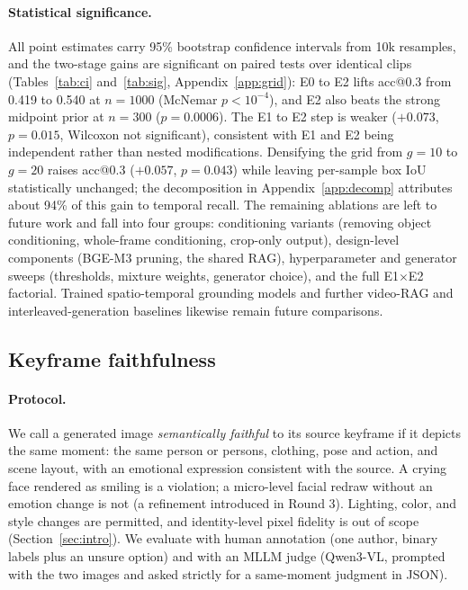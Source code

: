 \documentclass[10pt]{article}
\begin{document}
\paragraph{Statistical significance.}
All point estimates carry 95\% bootstrap confidence intervals from 10k resamples, and the two-stage gains are significant on paired tests over identical clips (Tables~\ref{tab:ci} and~\ref{tab:sig}, Appendix~\ref{app:grid}): E0 to E2 lifts acc@0.3 from 0.419 to 0.540 at $n=1000$ (McNemar $p<10^{-4}$), and E2 also beats the strong midpoint prior at $n=300$ ($p=0.0006$). The E1 to E2 step is weaker ($+0.073$, $p=0.015$, Wilcoxon not significant), consistent with E1 and E2 being independent rather than nested modifications. Densifying the grid from $g=10$ to $g=20$ raises acc@0.3 ($+0.057$, $p=0.043$) while leaving per-sample box IoU statistically unchanged; the decomposition in Appendix~\ref{app:decomp} attributes about 94\% of this gain to temporal recall. The remaining ablations are left to future work and fall into four groups: conditioning variants (removing object conditioning, whole-frame conditioning, crop-only output), design-level components (BGE-M3 pruning, the shared RAG), hyperparameter and generator sweeps (thresholds, mixture weights, generator choice), and the full E1$\times$E2 factorial. Trained spatio-temporal grounding models and further video-RAG and interleaved-generation baselines \citep{videorag2411,m2rag2411} likewise remain future comparisons.

\subsection{Keyframe faithfulness}\label{sec:exp-faith}

\paragraph{Protocol.}
We call a generated image \emph{semantically faithful} to its source keyframe if it depicts the same moment: the same person or persons, clothing, pose and action, and scene layout, with an emotional expression consistent with the source. A crying face rendered as smiling is a violation; a micro-level facial redraw without an emotion change is not (a refinement introduced in Round 3). Lighting, color, and style changes are permitted, and identity-level pixel fidelity is out of scope (Section~\ref{sec:intro}). We evaluate with human annotation (one author, binary labels plus an unsure option) and with an MLLM judge (Qwen3-VL, prompted with the two images and asked strictly for a same-moment judgment in JSON).
\end{document}

